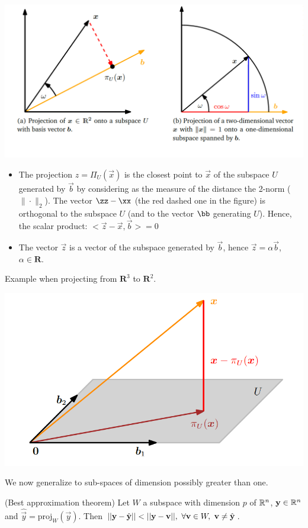 \includegraphics[width=0.7 \textwidth]{sections/images/orth2.png}

\begin{itemize}
    \item The projection $z=\Pi_U(\vec{x})$ is the closest point to $\vec{x}$ of the subspace $U$ generated by $\vec{b}$ by considering as the measure of the distance the 2-norm ($\| \cdot \|_2$). The vector $\zz -\xx$ (the red dashed one in the figure) is orthogonal to the subspace $U$ (and to the vector $\bb$ generating $U$). Hence, the scalar product: $<\vec{z}-\vec{x},\vec{b}>=0$
    \item The vector $\vec{z}$ is a vector of the subspace generated by $\vec{b}$, hence $\vec{z}=\alpha \vec{b}$, $\alpha \in \mathbf{R}.$
  
\end{itemize}




Example when projecting from $\mathbf{R}^3$ to $\mathbf{R}^2$.

\includegraphics[width=0.7 \textwidth]{sections/images/orth3.png}

We now generalize to sub-spaces of dimension possibly greater than one.

\begin{theorem} (Best approximation theorem)
    Let $W$ a subspace with dimension $p$ of $\mathbb{R}^n$, $\mathbf{y} \in \mathbb{R}^n$ and $\hat{\vec{y}} = \mathrm{proj}_W(\vec{y})$. Then $||\mathbf{y} - \hat{\mathbf{y}}|| < ||\mathbf{y} - \mathbf{v}||,\ \forall \mathbf{v} \in W,\ \mathbf{v} \neq \hat{\mathbf{y}}$.
\end{theorem}

